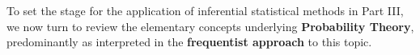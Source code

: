 \medskip
\noindent
To set the stage for the application of inferential statistical
methods in Part III, we now turn to review the elementary concepts
underlying \textbf{Probability Theory}, predominantly as
interpreted in the \textbf{frequentist approach} to this topic.


